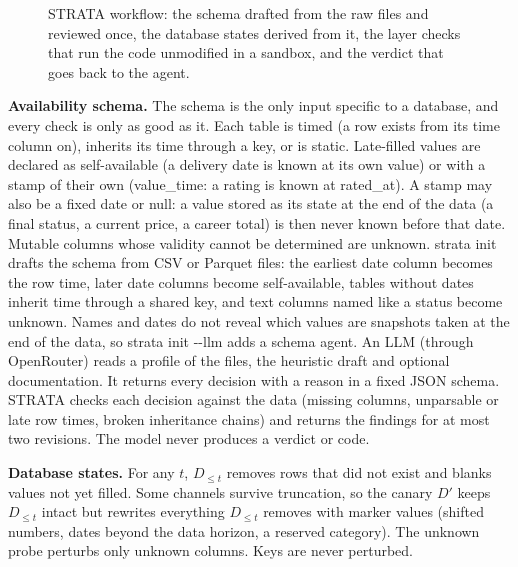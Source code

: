 \documentclass[10pt,conference]{IEEEtran}
\newcommand{\tool}{STRATA}
\newcommand{\Dfull}{D}
\newcommand{\Dcut}{D_{\le t}}
\begin{document}
\begin{figure}[t]
\centering
\resizebox{.8\textwidth}{!}{}
\caption{STRATA workflow: the schema drafted from the raw files and reviewed
once, the database states derived from it, the layer checks that run the
code unmodified in a sandbox, and the verdict that goes back to the agent.}
\label{fig:arch}
\end{figure}

\textbf{Availability schema.} The schema is the only input specific to a
database, and every check is only as good as it. Each table is timed
(a row exists from its time column on), inherits its time through a
key, or is static. Late-filled values are declared as
self-available (a delivery date is known at its own value) or with a
stamp of their own (value\_time: a rating is known at
rated\_at). A stamp may also be a fixed date or null: a
value stored as its state at the end of the data (a final status, a current price, a
career total) is then never known before that date. Mutable columns whose
validity cannot be determined are unknown.
strata init drafts the schema from CSV or Parquet files: the
earliest date column becomes the row time, later date columns become
self-available, tables without dates inherit time through a shared key, and
text columns named like a status become unknown. Names and dates
do not reveal which values are snapshots taken at the end of the data, so strata init
-{}-llm adds a schema agent. An LLM (through OpenRouter) reads a profile of
the files, the heuristic draft and optional documentation. It returns every
decision with a reason in a fixed JSON schema. \tool{} checks each decision
against the data (missing columns, unparsable or late row times, broken
inheritance chains) and returns the findings for at most two revisions. The
model never produces a verdict or code.

\textbf{Database states.} For any $t$, $\Dcut$ removes rows that did not
exist and blanks values not yet filled. Some channels survive truncation,
so the canary $\Dfull'$ keeps $\Dcut$ intact but rewrites everything $\Dcut$
removes with marker values (shifted numbers, dates beyond the data horizon,
a reserved category). The unknown probe perturbs only unknown columns. Keys
are never perturbed.
\end{document}
